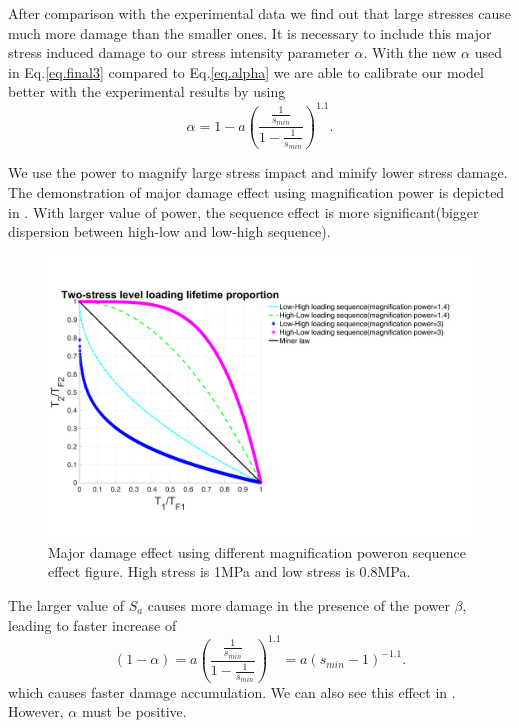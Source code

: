 After comparison with the experimental data we find out that large stresses cause much more damage than the smaller ones. It is necessary to include this major stress induced damage to our stress intensity parameter $\alpha$. With the new $\alpha$ used in Eq.\eqref{eq.final3} compared to Eq.\eqref{eq.alpha} we are able to calibrate our model better with the experimental results by using 
\begin{equation}
\alpha=1-a\left(  \dfrac{\frac{1}{s_{min}}}{1-\frac{1}{s_{min}}} \right) ^{1.1}.
\label{eq.majoralp}
\end{equation}


We use the power to magnify large stress impact and minify lower stress damage.  The demonstration of major damage effect using magnification power is depicted in . With larger value of power, the sequence effect is more significant(bigger dispersion between high-low and low-high sequence).

\begin{figure}[!h]
\centering
\includegraphics[width=\textwidth]{figures//sequence_ours.png} 
\caption{Major damage effect using different magnification poweron sequence effect figure. High stress is 1MPa and low stress is 0.8MPa.}
\label{fig.sequenceours}
\end{figure}

The larger value of $S_{a}$ causes more damage in the presence of the power $\beta$, leading to faster increase of 
$$(1-\alpha)=a\left(  \dfrac{\frac{1}{s_{min}}}{1-\frac{1}{s_{min}}} \right) ^1.1=a(s_{min}-1)^{-1.1}.$$ 
which causes faster damage accumulation. We can also see this effect in . However, $\alpha$ must be positive. 

